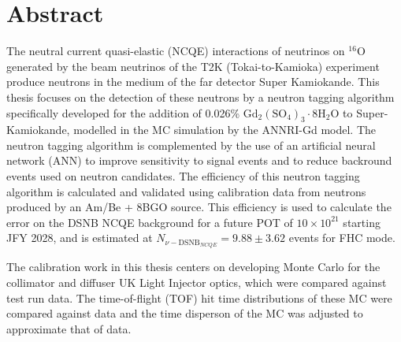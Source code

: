 \chapter*{Abstract}
\thispagestyle{empty}

The neutral current quasi-elastic (NCQE) interactions of neutrinos on ${ }^{16} \mathrm{O}$ generated by the beam neutrinos of the T2K (Tokai-to-Kamioka) experiment produce neutrons in the medium of the far detector Super Kamiokande. This thesis focuses on the detection of these neutrons by a neutron tagging algorithm specifically developed for the addition of 0.026\% $\mathrm{Gd}_{2}\left(\mathrm{SO}_{4}\right)_{3} \cdot 8 \mathrm{H}_{2} \mathrm{O}$ to Super-Kamiokande, modelled in the MC simulation by the ANNRI-Gd model. The neutron tagging algorithm is complemented by the use of an artificial neural network (ANN) to improve sensitivity to signal events and to reduce backround events used on neutron candidates. The efficiency of this neutron tagging algorithm is calculated and validated using calibration data from neutrons produced by an Am/Be + 8BGO source. This efficiency is used to calculate the error on the DSNB NCQE background for a future POT of $10 \times 10^{21}$ starting JFY 2028, and is estimated at $N_{\nu-\mathrm{DSNB}_{NCQE}}= 9.88 \pm 3.62$ events for FHC mode. 

The calibration work in this thesis centers on developing Monte Carlo for the collimator and diffuser UK Light Injector optics, which were compared against test run data. The time-of-flight (TOF) hit time distributions of these MC were compared against data and the time disperson of the MC was adjusted to approximate that of data.